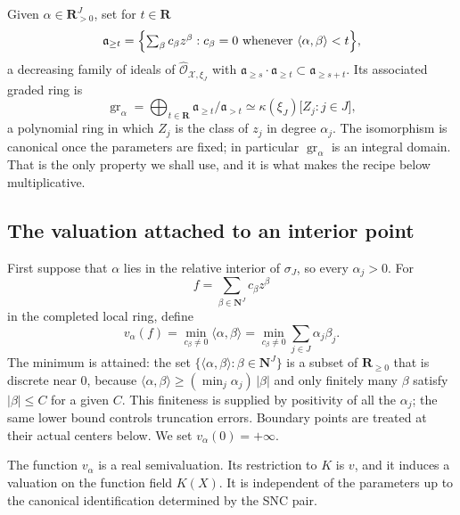 Given $\alpha\in\mathbf R_{>0}^{J}$, set for $t\in\mathbf R$
\[
 \mathfrak a_{\ge t}
 =\Bigl\{\textstyle\sum_\beta c_\beta z^\beta:
   c_\beta=0\text{ whenever }\langle\alpha,\beta\rangle<t\Bigr\},
\]
a decreasing family of ideals of
$\widehat{\mathcal O}_{\mathcal X,\xi_J}$ with
$\mathfrak a_{\ge s}\cdot\mathfrak a_{\ge t}\subset\mathfrak a_{\ge s+t}$.
Its associated graded ring is
\[
 \operatorname{gr}_\alpha
 =\bigoplus_{t\in\mathbf R}\mathfrak a_{\ge t}/\mathfrak a_{>t}
 \simeq\kappa(\xi_J)\bigl[Z_j:j\in J\bigr],
\]
a polynomial ring in which $Z_j$ is the class of $z_j$ in degree
$\alpha_j$. The isomorphism is canonical once the parameters are fixed;
in particular $\operatorname{gr}_\alpha$ is an integral domain. That is
the only property we shall use, and it is what makes the recipe below
multiplicative.

\subsection{The valuation attached to an interior point}

First suppose that $\alpha$ lies in the relative interior of
$\sigma_J$, so every $\alpha_j>0$. For
\[
                     f=\sum_{\beta\in\mathbf N^J}
                          c_\beta z^\beta
\]
in the completed local ring, define
\[
 v_\alpha(f)=
 \min_{c_\beta\neq0}\langle\alpha,\beta\rangle
 =\min_{c_\beta\neq0}\sum_{j\in J}\alpha_j\beta_j.
\]
The minimum is attained: the set
$\{\langle\alpha,\beta\rangle:\beta\in\mathbf N^J\}$ is a subset of
$\mathbf R_{\ge0}$ that is discrete near $0$, because
$\langle\alpha,\beta\rangle\ge(\min_j\alpha_j)\,|\beta|$ and only finitely
many $\beta$ satisfy $|\beta|\le C$ for a given $C$. This finiteness is
supplied by positivity of all the $\alpha_j$; the same lower
bound controls truncation errors. Boundary points are treated at their
actual centers below. We set $v_\alpha(0)=+\infty$.

\begin{lemma}
\label{lem:monomial-valuation}
The function $v_\alpha$ is a real semivaluation. Its restriction to $K$
is $v$, and it induces a valuation on the function field $K(X)$. It is
independent of the parameters up to the canonical identification determined
by the SNC pair.
\end{lemma}

